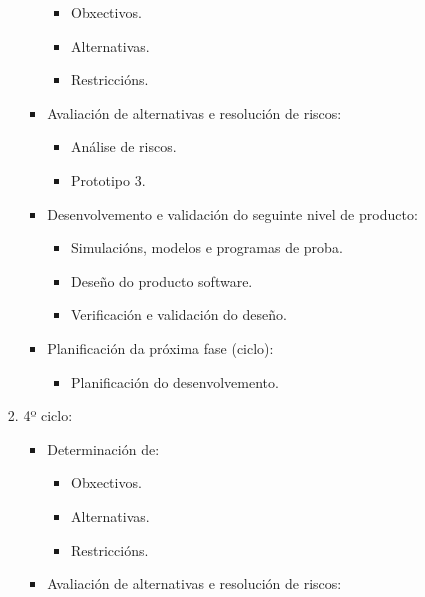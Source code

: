 \begin{itemize}
\begin{itemize}
\begin{enumerate}
\begin{itemize}
\begin{itemize}
                             \item Obxectivos.
                             \item Alternativas.
                             \item Restriccións.
                            \end{itemize}
                      \item Avaliación de alternativas e resolución de riscos:
                            \begin{itemize}
                             \item Análise de riscos.
                             \item Prototipo 3.
                            \end{itemize}
                      \item Desenvolvemento e validación do seguinte nivel de producto:
                            \begin{itemize}
                             \item Simulacións, modelos e programas de proba.
                             \item Deseño do producto software.
                             \item Verificación e validación do deseño.
                            \end{itemize}
                      \item Planificación da próxima fase (ciclo):
                            \begin{itemize}
                             \item Planificación do desenvolvemento.
                            \end{itemize}
                     \end{itemize}
               \item 4º ciclo:
                     \begin{itemize}
                      \item Determinación de:
                            \begin{itemize}
                             \item Obxectivos.
                             \item Alternativas.
                             \item Restriccións.
                            \end{itemize}
                      \item Avaliación de alternativas e resolución de riscos:

\end{itemize}
\end{enumerate}
\end{itemize}
\end{itemize}
